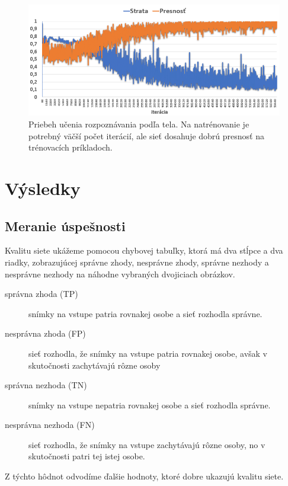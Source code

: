 \begin{figure}[H]
\centerline{\includegraphics[width=1\textwidth]{images/graph_learn_body.png}}
\caption[Priebeh učenia rozpoznávania podľa tela]{Priebeh učenia rozpoznávania podľa tela. Na natrénovanie je potrebný väčší počet iterácií, ale sieť dosahuje dobrú presnosť na trénovacích príkladoch.}
\label{obr:graph_learn_body}
\end{figure}


\section{Výsledky}

\subsection{Meranie úspešnosti}
Kvalitu siete ukážeme pomocou chybovej tabuľky, ktorá má dva stĺpce a dva riadky, zobrazujúcej
správne zhody, nesprávne zhody, správne nezhody a nesprávne nezhody na náhodne vybraných dvojiciach obrázkov.

\begin{description}
\item[správna zhoda (TP)]
snímky na vstupe patria rovnakej osobe a sieť rozhodla správne.

\item[nesprávna zhoda (FP)]
sieť rozhodla, že snímky na vstupe patria rovnakej osobe, avšak v skutočnosti zachytávajú rôzne osoby

\item[správna nezhoda (TN)]
snímky na vstupe nepatria rovnakej osobe a sieť rozhodla správne.

\item[nesprávna nezhoda (FN)]
sieť rozhodla, že snímky na vstupe zachytávajú rôzne osoby, no v skutočnosti patri tej istej osobe.
\end{description}

Z týchto hôdnot odvodíme ďalšie hodnoty, ktoré dobre ukazujú kvalitu siete.

